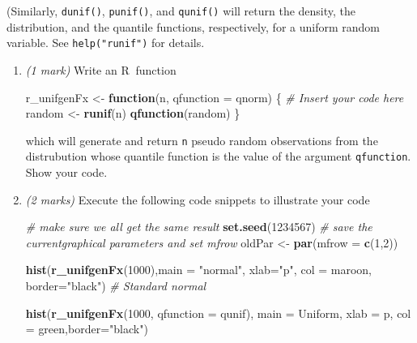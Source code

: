 \documentclass[
  9pt,
]{article}
\newenvironment{Shaded}{\begin{snugshade}}{\end{snugshade}}
\newcommand{\CommentTok}[1]{\textcolor[rgb]{0.56,0.35,0.01}{\textit{#1}}}
\newcommand{\ControlFlowTok}[1]{\textcolor[rgb]{0.13,0.29,0.53}{\textbf{#1}}}
\newcommand{\DataTypeTok}[1]{\textcolor[rgb]{0.13,0.29,0.53}{#1}}
\newcommand{\DecValTok}[1]{\textcolor[rgb]{0.00,0.00,0.81}{#1}}
\newcommand{\KeywordTok}[1]{\textcolor[rgb]{0.13,0.29,0.53}{\textbf{#1}}}
\newcommand{\NormalTok}[1]{#1}
\newcommand{\StringTok}[1]{\textcolor[rgb]{0.31,0.60,0.02}{#1}}
\begin{document}
\begin{enumerate}
\begin{enumerate}
    (Similarly, \texttt{dunif()}, \texttt{punif()}, and \texttt{qunif()}
    will return the density, the distribution, and the quantile
    functions, respectively, for a uniform random variable. See
    \texttt{help("runif")} for details.

    \begin{enumerate}
    \def\labelenumiii{\roman{enumiii}.}
    \item
      \emph{(1 mark)} Write an \textsf{R}$~$ function

\begin{Shaded}
\begin{Highlighting}[]
\NormalTok{r\_unifgenFx <{-}}\StringTok{ }\ControlFlowTok{function}\NormalTok{(n, }\DataTypeTok{qfunction =}\NormalTok{ qnorm) \{}
                    \CommentTok{\# Insert your code here}
\NormalTok{                    random <{-}}\StringTok{ }\KeywordTok{runif}\NormalTok{(n)}
                    \KeywordTok{qfunction}\NormalTok{(random)}
\NormalTok{                     \}}
\end{Highlighting}
\end{Shaded}

      which will generate and return \texttt{n} pseudo random
      observations from the distrubution whose quantile function is the
      value of the argument \texttt{qfunction}. Show your code.
    \item
      \emph{(2 marks)} Execute the following code snippets to illustrate
      your code

\begin{Shaded}
\begin{Highlighting}[]
\CommentTok{\# make sure we all get the same result}
\KeywordTok{set.seed}\NormalTok{(}\DecValTok{1234567}\NormalTok{)}
\CommentTok{\# save the currentgraphical parameters and set \textasciigrave{}mfrow\textasciigrave{}}
\NormalTok{oldPar <{-}}\StringTok{ }\KeywordTok{par}\NormalTok{(}\DataTypeTok{mfrow =} \KeywordTok{c}\NormalTok{(}\DecValTok{1}\NormalTok{,}\DecValTok{2}\NormalTok{))}

\KeywordTok{hist}\NormalTok{(}\KeywordTok{r\_unifgenFx}\NormalTok{(}\DecValTok{1000}\NormalTok{),}\DataTypeTok{main =} \StringTok{"normal"}\NormalTok{, }\DataTypeTok{xlab=}\StringTok{"p"}\NormalTok{, }\DataTypeTok{col =} \StringTok{\textquotesingle{}maroon\textquotesingle{}}\NormalTok{, }\DataTypeTok{border=}\StringTok{"black"}\NormalTok{)  }\CommentTok{\# Standard normal}

\KeywordTok{hist}\NormalTok{(}\KeywordTok{r\_unifgenFx}\NormalTok{(}\DecValTok{1000}\NormalTok{, }\DataTypeTok{qfunction =}\NormalTok{ qunif), }\DataTypeTok{main =} \StringTok{\textquotesingle{}Uniform\textquotesingle{}}\NormalTok{, }\DataTypeTok{xlab =} \StringTok{\textquotesingle{}p\textquotesingle{}}\NormalTok{, }\DataTypeTok{col =} \StringTok{\textquotesingle{}green\textquotesingle{}}\NormalTok{,}\DataTypeTok{border=}\StringTok{"black"}\NormalTok{)}
\end{Highlighting}
\end{Shaded}


\end{enumerate}
\end{enumerate}
\end{enumerate}
\end{document}
